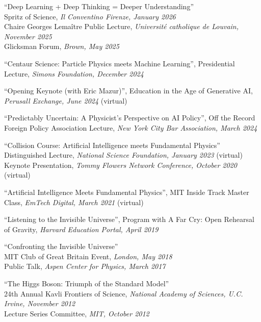 \bbl

\item ``Deep Learning + Deep Thinking = Deeper Understanding''
\\ Spritz of Science, \emph{Il Conventino Firenze, January 2026}
\\ Chaire Georges Lemaître Public Lecture, \emph{Université catholique de Louvain, November 2025}
\\ Glicksman Forum, \emph{Brown, May 2025}

\item ``Centaur Science:  Particle Physics meets Machine Learning'', Presidential Lecture, \emph{Simons Foundation, December 2024}

\item ``Opening Keynote (with Eric Mazur)'', Education in the Age of Generative AI, \emph{Perusall Exchange, June 2024} (virtual)

\item ``Predictably Uncertain: A Physicist’s Perspective on AI Policy'', Off the Record Foreign Policy Association Lecture, \emph{New York City Bar Association, March 2024}

\item ``Collision Course: Artificial Intelligence meets Fundamental Physics''
\\ Distinguished Lecture, \emph{National Science Foundation, January 2023} (virtual)
\\ Keynote Presentation, \emph{Tommy Flowers Network Conference, October 2020} (virtual)

\item ``Artificial Intelligence Meets Fundamental Physics'', MIT Inside Track Master Class, \emph{EmTech Digital, March 2021} (virtual)

\item ``Listening to the Invisible Universe'', Program with A Far Cry: Open Rehearsal of Gravity, \emph{Harvard Education Portal, April 2019}

\item ``Confronting the Invisible Universe''
\\ MIT Club of Great Britain Event, \emph{London, May 2018}
\\ Public Talk, \emph{Aspen Center for Physics, March 2017}

\item ``The Higgs Boson:  Triumph of the Standard Model''
\\ 24th Annual Kavli Frontiers of Science, \emph{National Academy of Sciences, U.C. Irvine, November 2012}
\\ Lecture Series Committee, \emph{MIT, October 2012}

\el
